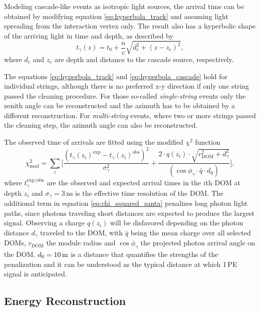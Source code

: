 Modeling cascade-like events as isotropic light sources, the arrival time can be obtained by modifying equation \ref{eq:hyperbola_track} and assuming light spreading from the interaction vertex only.
The result also has a hyperbolic shape of the arriving light in time and depth, as described by
\begin{equation}
    t_\gamma(z) = t_0 + \frac{n}{c} \sqrt{d_c^2+(z-z_c)^2},
    \label{eq:hyperbola_cascade}
\end{equation}
where $d_c$ and $z_c$ are depth and distance to the cascade source, respectively.

The equations \ref{eq:hyperbola_track} and \ref{eq:hyperbola_cascade} hold for individual strings, although there is no preferred x-y direction if only one string passed the cleaning procedure.
For those so-called \textit{single-string} events only the zenith angle can be reconstructed and the azimuth has to be obtained by a different reconstruction.
For \textit{multi-string} events, where two or more strings passed the cleaning step, the azimuth angle can also be reconstructed.

The observed time of arrivals are fitted using the modified $\chi^2$ function
\begin{equation}
    \chi^2_{\mathrm{mod}} = \sum_i \Bigg[
        \frac{( t_\gamma(z_i)^{\mathrm{exp}} - t_\gamma(z_i)^{\mathrm{obs}} )^2} {\sigma^2_\gamma} 
        +
        \frac{2 \cdot q(z_i) \cdot \sqrt{r^2_{\mathrm{DOM}}+d^2_\gamma}}{(\cos\phi_\gamma \cdot \bar{q} \cdot d_0)}
    \Bigg],
    \label{eq:chi_squared_santa}
\end{equation}
where $t_\gamma^{\mathrm{exp}/{\mathrm{obs}}}$ are the observed and expected arrival times in the $i$th DOM at depth $z_i$ and $\sigma_\gamma = 3\mathrm{\,ns}$ is the effective time resolution of the DOM.
The additional term in equation \ref{eq:chi_squared_santa} penalizes long photon light paths, since photons traveling short distances are expected to produce the largest signal.
Observing a charge $q(z_i)$ will be disfavored depending on the photon distance $d_\gamma$ traveled to the DOM, with $\bar{q}$ being the mean charge over all selected DOMs, $r_{\mathrm{DOM}}$ the module radius and $\cos\phi_\gamma$ the projected photon arrival angle on the DOM.
$d_0=10\textrm{\,m}$ is a distance that quantifies the strengths of the penalization and it can be understood as the typical distance at which 1\,PE signal is anticipated.


\subsection{Energy Reconstruction} \label{sec:energy_reconstruction}

